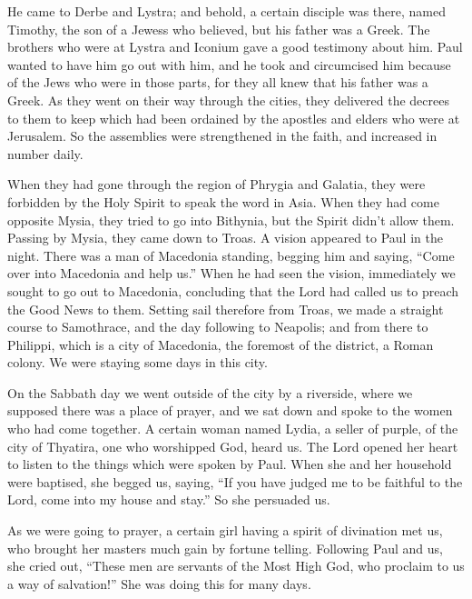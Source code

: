  He came to Derbe and Lystra; and behold, a certain
disciple was there, named Timothy, the son of a Jewess who believed, but
his father was a Greek.  The brothers who were at Lystra
and Iconium gave a good testimony about him.  Paul wanted
to have him go out with him, and he took and circumcised him because of
the Jews who were in those parts, for they all knew that his father was
a Greek.  As they went on their way through the cities,
they delivered the decrees to them to keep which had been ordained by
the apostles and elders who were at Jerusalem.  So the
assemblies were strengthened in the faith, and increased in number
daily.

 When they had gone through the region of Phrygia and
Galatia, they were forbidden by the Holy Spirit to speak the word in
Asia.  When they had come opposite Mysia, they tried to go
into Bithynia, but the Spirit didn't allow them.  Passing
by Mysia, they came down to Troas.  A vision appeared to
Paul in the night. There was a man of Macedonia standing, begging him
and saying, ``Come over into Macedonia and help us.'' 
When he had seen the vision, immediately we sought to go out to
Macedonia, concluding that the Lord had called us to preach the Good
News to them.  Setting sail therefore from Troas, we made
a straight course to Samothrace, and the day following to Neapolis;
 and from there to Philippi, which is a city of
Macedonia, the foremost of the district, a Roman colony. We were staying
some days in this city.

 On the Sabbath day we went outside of the city by a
riverside, where we supposed there was a place of prayer, and we sat
down and spoke to the women who had come together.  A
certain woman named Lydia, a seller of purple, of the city of Thyatira,
one who worshipped God, heard us. The Lord opened her heart to listen to
the things which were spoken by Paul.  When she and her
household were baptised, she begged us, saying, ``If you have judged me
to be faithful to the Lord, come into my house and stay.'' So she
persuaded us.

 As we were going to prayer, a certain girl having a
spirit of divination met us, who brought her masters much gain by
fortune telling.  Following Paul and us, she cried out,
``These men are servants of the Most High God, who proclaim to us a way
of salvation!''  She was doing this for many days.

